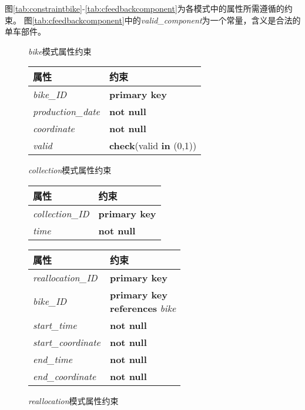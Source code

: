 图\ref{tab:constraintbike}-\ref{tab:cfeedbackcomponent}为各模式中的属性所需遵循的约束。
  图\ref{tab:cfeedbackcomponent}中的\textit{valid\_component}为一个常量，含义是合法的单车部件。

\begin{figure}[!htp]
    \begin{minipage}{0.3\textwidth}
      \centering
      \caption{\textit{bike}模式属性约束}
      \label{tab:constraintbike}
      \begin{tabular}{ll}\toprule
        属性&约束\\\midrule
       \textit{bike\_ID}&\textbf{primary key}\\
       \textit{production\_date}&\textbf{not null}\\
       \textit{coordinate}&\textbf{not null}\\
       \textit{valid}&\textbf{check}(valid \textbf{in} (0,1))\\
       \bottomrule
      \end{tabular}
    \end{minipage}\hfill
    \begin{minipage}{0.3\textwidth}
      \centering
      \caption{\textit{collection}模式属性约束}
      \label{tab:constraintcollection}
      \begin{tabular}{ll}\toprule
        属性&约束\\\midrule
       \textit{collection\_ID}&\textbf{primary key}\\
       \textit{time}&\textbf{not null}\\
       \bottomrule
      \end{tabular}
    \end{minipage}\hfill
    \begin{minipage}{0.3\textwidth}
      \centering
      \caption{\textit{reallocation}模式属性约束}
      \label{tab:constraintreallocation}
      \begin{tabular}{ll}\toprule
        属性&约束\\\midrule
       \textit{reallocation\_ID}&\textbf{primary key}\\
       \textit{bike\_ID}&\makecell[l]{\textbf{primary key}\\\textbf{references} \textit{bike}}\\
       \textit{start\_time}&\textbf{not null}\\
       \textit{start\_coordinate}&\textbf{not null}\\
       \textit{end\_time}&\textbf{not null}\\
       \textit{end\_coordinate}&\textbf{not null}\\
       \bottomrule
      \end{tabular}
    \end{minipage}\hfill
  \end{figure}
